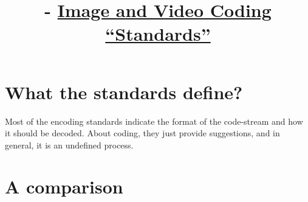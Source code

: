 
\title{\SM{} - \href{https://github.com/Sistemas-Multimedia/Sistemas-Multimedia.github.io/tree/master/contents/standards}{Image and Video Coding ``Standards''}}

\maketitle

\tableofcontents

\section{What the standards define?}
Most of the encoding standards indicate the format of the code-stream
and how it should be decoded. About coding, they just provide
suggestions, and in general, it is an undefined process.


\section{A comparison}

